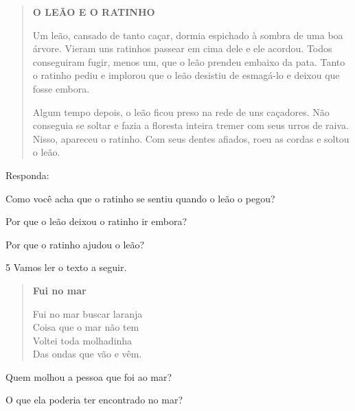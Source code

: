 \begin{quote}
\textbf{O LEÃO E O RATINHO}

Um leão, cansado de tanto caçar, dormia espichado à sombra de uma boa
árvore. Vieram uns ratinhos passear em cima dele e ele acordou. Todos
conseguiram fugir, menos um, que o leão prendeu embaixo da pata. Tanto o
ratinho pediu e implorou que o leão desistiu de esmagá-lo e deixou que
fosse embora.

Algum tempo depois, o leão ficou preso na rede de uns caçadores. Não
conseguia se soltar e fazia a floresta inteira tremer com seus urros de
raiva. Nisso, apareceu o ratinho. Com seus dentes afiados, roeu as
cordas e soltou o leão.
\end{quote}


Responda:

\begin{escolha}
\item Como você acha que o ratinho se sentiu quando o leão o pegou?


\item Por que o leão deixou o ratinho ir embora?


\item Por que o ratinho ajudou o leão?

\end{escolha}

\num{5} Vamos ler o texto a seguir.

\begin{verse}
\textbf{Fui no mar}

Fui no mar buscar laranja\\
Coisa que o mar não tem\\
Voltei toda molhadinha\\
Das ondas que vão e vêm.
\end{verse}


\begin{escolha}
\item Quem molhou a pessoa que foi ao mar?


\item O que ela poderia ter encontrado no mar?

\end{escolha}


